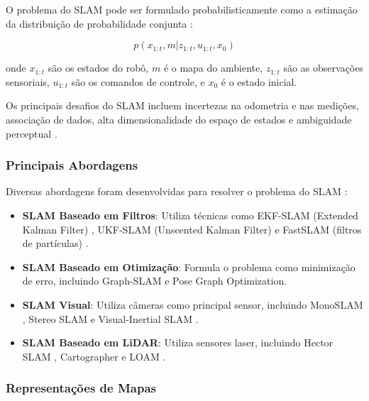 O problema do SLAM pode ser formulado probabilisticamente como a estimação da distribuição de probabilidade conjunta \cite{Durrant2006, Thrun2005}:

\begin{equation}
p(x_{1:t}, m | z_{1:t}, u_{1:t}, x_0)
\end{equation}

onde $x_{1:t}$ são os estados do robô, $m$ é o mapa do ambiente, $z_{1:t}$ são as observações sensoriais, $u_{1:t}$ são os comandos de controle, e $x_0$ é o estado inicial.

Os principais desafios do SLAM incluem incertezas na odometria e nas medições, associação de dados, alta dimensionalidade do espaço de estados e ambiguidade perceptual \cite{Durrant2006, Thrun2005}.

\subsubsection{Principais Abordagens}

Diversas abordagens foram desenvolvidas para resolver o problema do SLAM \cite{Durrant2006, Thrun2005, Cadena2016}:

\begin{itemize}
    \item \textbf{SLAM Baseado em Filtros}: Utiliza técnicas como EKF-SLAM (Extended Kalman Filter) \cite{Smith1990}, UKF-SLAM (Unscented Kalman Filter) \cite{Julier2004} e FastSLAM (filtros de partículas) \cite{Montemerlo2002}.
    
    \item \textbf{SLAM Baseado em Otimização}: Formula o problema como minimização de erro, incluindo Graph-SLAM \cite{Grisetti2010} e Pose Graph Optimization.
    
    \item \textbf{SLAM Visual}: Utiliza câmeras como principal sensor, incluindo MonoSLAM \cite{Davison2007}, Stereo SLAM \cite{Paz2008} e Visual-Inertial SLAM \cite{Mourikis2007}.
    
    \item \textbf{SLAM Baseado em LiDAR}: Utiliza sensores laser, incluindo Hector SLAM \cite{Kohlbrecher2011}, Cartographer \cite{Hess2016} e LOAM \cite{Zhang2014}.
\end{itemize}

\subsubsection{Representações de Mapas}

